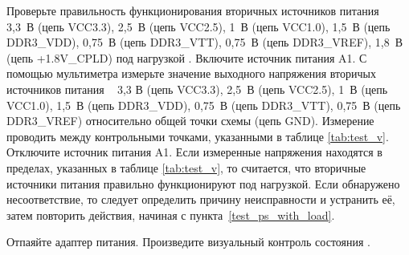   \subpoint Проверьте правильность функционирования вторичных источников питания \DocProductShortTitle~ 
	    3,3~В (цепь VCC3.3), 2,5~В (цепь VCC2.5), 1~В (цепь VCC1.0), 1,5~В (цепь DDR3\_VDD), 0,75~В (цепь DDR3\_VTT), 0,75~В (цепь DDR3\_VREF), 1,8~В (цепь +1.8V\_CPLD)
	    под нагрузкой .
  \label {test_ps_with_load} %
    \subsubpoint Включите источник питания A1.
    \subsubpoint С помощью мультиметра измерьте значение выходного напряжения вторичых источников питания \DocProductShortTitle~ 
		  3,3 В (цепь VCC3.3), 2,5~В (цепь VCC2.5), 1~В (цепь VCC1.0), 1,5~В (цепь DDR3\_VDD), 0,75~В (цепь DDR3\_VTT), 0,75~В (цепь DDR3\_VREF)
		  относительно общей точки схемы (цепь GND). 
		  Измерение проводить между контрольными точками, указанными в таблице \ref{tab:test_v}.        
    \subsubpoint Отключите источник питания A1.
    \subsubpoint Если измеренные напряжения находятся в пределах, указанных в таблице \ref{tab:test_v}, то считается, что вторичные источники питания правильно функционируют под нагрузкой.
    \subsubpoint Если обнаружено несоответствие, то следует определить причину неисправности и устранить её, затем повторить действия, начиная с пункта~\ref{test_ps_with_load}.
  
  \subpoint Отпаяйте адаптер питания.
  \subpoint Произведите визуальный контроль состояния \DocProductShortTitle .

